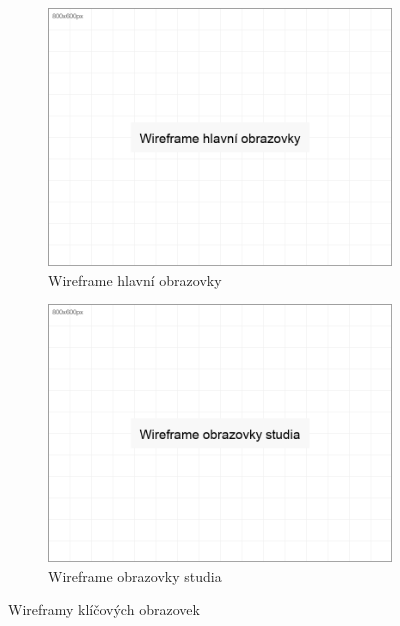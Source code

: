 \documentclass[12pt, a4paper, twoside, openright]{report}
\begin{document}
	\begin{figure}[h]
		\centering
		\begin{subfigure}[b]{0.48\textwidth}
			\includegraphics[width=\linewidth]{image/wireframe-main.png}
			\caption{Wireframe hlavní obrazovky}
			\label{fig:wireframe-main}
		\end{subfigure}
		\hfill
		\begin{subfigure}[b]{0.48\textwidth}
			\includegraphics[width=\linewidth]{image/wireframe-study.png}
			\caption{Wireframe obrazovky studia}
			\label{fig:wireframe-study}
		\end{subfigure}
		\caption{Wireframy klíčových obrazovek}
		\label{fig:wireframes}
	\end{figure}
\end{document}
